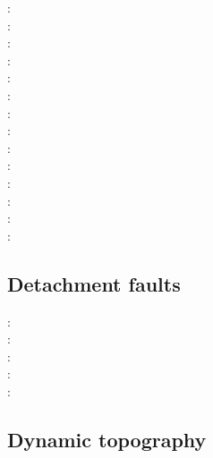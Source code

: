 \begin{scriptsize}
\nineteenninetyfive: \cite{kian95}\\
\nineteenninetyseven: \cite{homo97}\\
\nineteenninetyeight: \cite{kian98}\cite{scsc98}\cite{mafs98}\\
\twothousand: \cite{kiri00}\cite{scys00}\\
\twothousandfour: \cite{modo04}\\
\twothousandseven: \cite{elki07}\\
\twothousandeight: \cite{vanv08}\cite{gopy08}\cite{vavg08}\\
\twothousandten: \cite{vabv10}\\
\twothousandeleven: \cite{lesm11}\cite{vanj11}\\
\twothousandthirteen: \cite{krcu13}\cite{sths13}\\
\twothousandfourteen: \cite{baeg14}\cite{kava14}\\
\twothousandfifteen: \cite{wahz15}\\
\twothousandseventeen: \cite{bems17}\\
\twothousandeighteen: \cite{peka18}
\end{scriptsize}


\subsection{Detachment faults} 

\begin{scriptsize}
\twothousandseven: \cite{werr07}\\
\twothousandten: \cite{jaml10}\\
\twothousandeleven: \cite{rera11}\\
\twothousandfifteen: \cite{matv15}\\
\twothousandnineteen: \cite{gubg19}
\end{scriptsize}


\subsection{Dynamic topography} 

